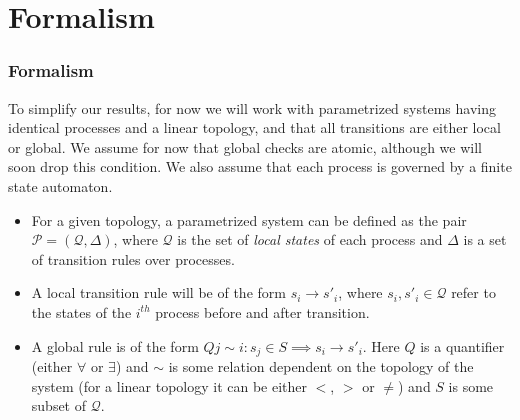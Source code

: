 \documentclass{beamer}
\begin{document}
    \section{Formalism}
    {
        \begin{frame}
            \frametitle{Formalism}
            To simplify our results, for now we will work with parametrized systems having identical processes and a linear topology, and that all transitions are either local or global. We assume for now that global checks are atomic, although we will soon drop this condition. We also assume that each process is governed by a finite state automaton.
            \begin{itemize}
                \item For a given topology, a parametrized system can be defined as the pair $\mathcal{P} = (\mathcal{Q}, \Delta)$, where $\mathcal{Q}$ is the set of \textit{local states} of each process and $\Delta$ is a set of transition rules over processes.
                \item A local transition rule will be of the form $s_{i} \rightarrow s'_{i}$, where $s_{i}, s'_{i} \in \mathcal{Q}$ refer to the states of the $i^{th}$ process before and after transition.
                \item A global rule is of the form $Q  j \sim i : s_{j} \in S \implies s_{i} \rightarrow s'_{i}$. Here $Q$ is a quantifier (either $\forall$ or $\exists$) and $\sim$ is some relation dependent on the topology of the system (for a linear topology it can be either $<$, $>$ or $\neq$)
                and $S$ is some subset of $\mathcal{Q}$.
            \end{itemize}
        \end{frame}

}
\end{document}
